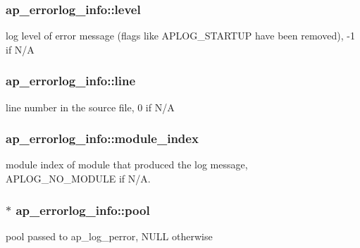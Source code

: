 \subsubsection[{\texorpdfstring{level}{level}}]{ ap\+\_\+errorlog\+\_\+info\+::level}\hypertarget{structap__errorlog__info_aa22b34a73030fbbe1848c75deb7c6893}{}\label{structap__errorlog__info_aa22b34a73030fbbe1848c75deb7c6893}
log level of error message (flags like A\+P\+L\+O\+G\+\_\+\+S\+T\+A\+R\+T\+UP have been removed), -\/1 if N/A 
\subsubsection[{\texorpdfstring{line}{line}}]{ ap\+\_\+errorlog\+\_\+info\+::line}\hypertarget{structap__errorlog__info_aa66bf74fd37cbf5afe18d41a671092d8}{}\label{structap__errorlog__info_aa66bf74fd37cbf5afe18d41a671092d8}
line number in the source file, 0 if N/A 
\subsubsection[{\texorpdfstring{module\+\_\+index}{module_index}}]{ ap\+\_\+errorlog\+\_\+info\+::module\+\_\+index}\hypertarget{structap__errorlog__info_a2462b68432bbcbcba25542b4e22bbc54}{}\label{structap__errorlog__info_a2462b68432bbcbcba25542b4e22bbc54}
module index of module that produced the log message, A\+P\+L\+O\+G\+\_\+\+N\+O\+\_\+\+M\+O\+D\+U\+LE if N/A. 
\subsubsection[{\texorpdfstring{pool}{pool}}]{$\ast$ ap\+\_\+errorlog\+\_\+info\+::pool}\hypertarget{structap__errorlog__info_a75772075fde735fbd67942d37108cfcb}{}\label{structap__errorlog__info_a75772075fde735fbd67942d37108cfcb}
pool passed to ap\+\_\+log\+\_\+perror, N\+U\+LL otherwise 
